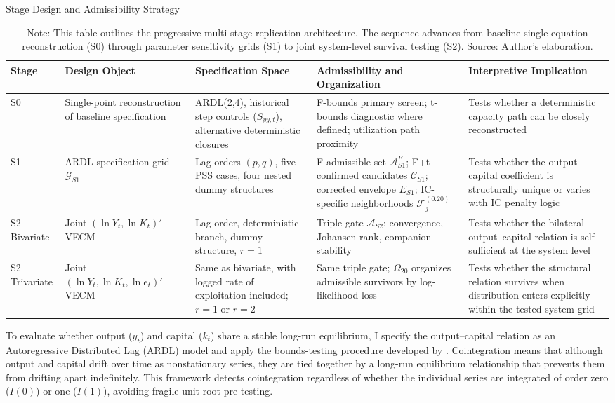 \begin{table}[h!]
\centering
\scriptsize
\caption{Stage Design and Admissibility Strategy}
\label{tab:cross_stage_synthesis_design}
\begin{tabular}{@{}>{\raggedright\arraybackslash}p{1.6cm}>{\raggedright\arraybackslash}p{2.6cm}>{\raggedright\arraybackslash}p{3.0cm}>{\raggedright\arraybackslash}p{3.2cm}>{\raggedright\arraybackslash}p{3.2cm}@{}}
\toprule
Stage & Design Object & Specification Space & Admissibility and Organization & Interpretive Implication \\
\midrule
\midrule
S0 & Single-point reconstruction of baseline specification & ARDL(2,4), historical step controls ($S_{yy,t}$), alternative deterministic closures & F-bounds primary screen; t-bounds diagnostic where defined; utilization path proximity & Tests whether a deterministic capacity path can be closely reconstructed \\
S1 & ARDL specification grid $\mathcal{G}_{S1}$ & Lag orders $(p,q)$, five PSS cases, four nested dummy structures & F-admissible set $\mathcal{A}^{F}_{S1}$; F+t confirmed candidates $\mathcal{C}_{S1}$; corrected envelope $E_{S1}$; IC-specific neighborhoods $\mathcal{F}^{(0.20)}_j$ & Tests whether the output--capital coefficient is structurally unique or varies with IC penalty logic \\
S2 Bivariate & Joint $(\ln Y_t, \ln K_t)'$ VECM & Lag order, deterministic branch, dummy structure, $r=1$ & Triple gate $\mathcal{A}_{S2}$: convergence, Johansen rank, companion stability & Tests whether the bilateral output--capital relation is self-sufficient at the system level \\
S2 Trivariate & Joint $(\ln Y_t, \ln K_t, \ln e_t)'$ VECM & Same as bivariate, with logged rate of exploitation included; $r=1$ or $r=2$ & Same triple gate; $\Omega_{20}$ organizes admissible survivors by log-likelihood loss & Tests whether the structural relation survives when distribution enters explicitly within the tested system grid \\
\bottomrule
\end{tabular}
\caption*{\footnotesize Note: This table outlines the progressive multi-stage replication architecture. The sequence advances from baseline single-equation reconstruction (S0) through parameter sensitivity grids (S1) to joint system-level survival testing (S2). Source: Author's elaboration.}
\end{table}

To evaluate whether output ($y_t$) and capital ($k_t$) share a stable long-run equilibrium, I specify the output--capital relation as an Autoregressive Distributed Lag (ARDL) model and apply the bounds-testing procedure developed by \citet{Pesaran2001}. Cointegration means that although output and capital drift over time as nonstationary series, they are tied together by a long-run equilibrium relationship that prevents them from drifting apart indefinitely. This framework detects cointegration regardless of whether the individual series are integrated of order zero ($I(0)$) or one ($I(1)$), avoiding fragile unit-root pre-testing.

